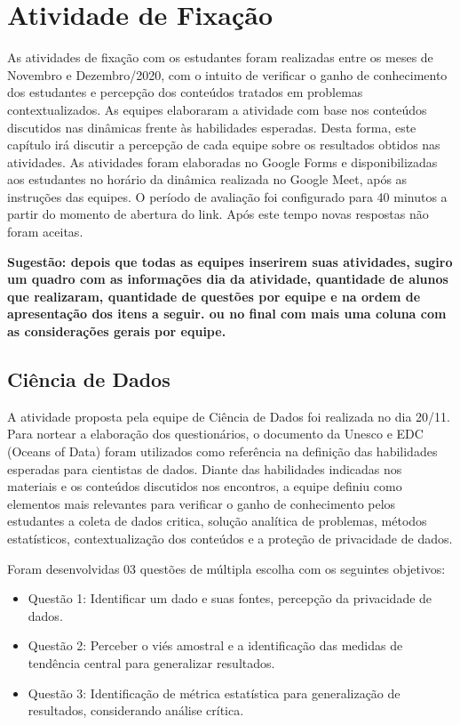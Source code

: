 \documentclass[
]{book}
\providecommand{\tightlist}{%
  \setlength{\itemsep}{0pt}\setlength{\parskip}{0pt}}
\begin{document}
\hypertarget{atividade-de-fixauxe7uxe3o}{%
\chapter{Atividade de Fixação}\label{atividade-de-fixauxe7uxe3o}}

As atividades de fixação com os estudantes foram realizadas entre os meses de Novembro e Dezembro/2020, com o intuito de verificar o ganho de conhecimento dos estudantes e percepção dos conteúdos tratados em problemas contextualizados. As equipes elaboraram a atividade com base nos conteúdos discutidos nas dinâmicas frente às habilidades esperadas. Desta forma, este capítulo irá discutir a percepção de cada equipe sobre os resultados obtidos nas atividades.
As atividades foram elaboradas no Google Forms e disponibilizadas aos estudantes no horário da dinâmica realizada no Google Meet, após as instruções das equipes. O período de avaliação foi configurado para 40 minutos a partir do momento de abertura do link. Após este tempo novas respostas não foram aceitas.

\textbf{Sugestão: depois que todas as equipes inserirem suas atividades, sugiro um quadro com as informações dia da atividade, quantidade de alunos que realizaram, quantidade de questões por equipe e na ordem de apresentação dos itens a seguir. ou no final com mais uma coluna com as considerações gerais por equipe.}

\hypertarget{ciuxeancia-de-dados-1}{%
\section{Ciência de Dados}\label{ciuxeancia-de-dados-1}}

A atividade proposta pela equipe de Ciência de Dados foi realizada no dia 20/11. Para nortear a elaboração dos questionários, o documento da Unesco e EDC (Oceans of Data) foram utilizados como referência na definição das habilidades esperadas para cientistas de dados. Diante das habilidades indicadas nos materiais e os conteúdos discutidos nos encontros, a equipe definiu como elementos mais relevantes para verificar o ganho de conhecimento pelos estudantes a coleta de dados critica, solução analítica de problemas, métodos estatísticos, contextualização dos conteúdos e a proteção de privacidade de dados.

Foram desenvolvidas 03 questões de múltipla escolha com os seguintes objetivos:

\begin{itemize}
\tightlist
\item
  Questão 1: Identificar um dado e suas fontes, percepção da privacidade de dados.\\
\item
  Questão 2: Perceber o viés amostral e a identificação das medidas de tendência central para generalizar resultados.
\item
  Questão 3: Identificação de métrica estatística para generalização de resultados, considerando análise crítica.
\end{itemize}
\end{document}

